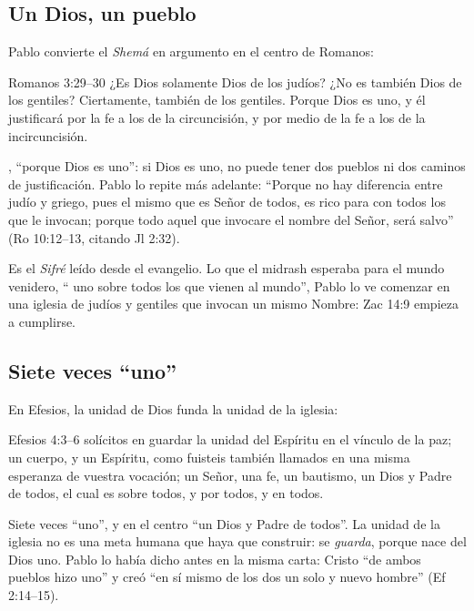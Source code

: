 \subsection{Un Dios, un pueblo}
Pablo convierte el \emph{Shemá} en argumento en el centro de Romanos:

\begin{verso}{Romanos 3:29–30}
¿Es Dios solamente Dios de los judíos? ¿No es también Dios de los gentiles? Ciertamente, también de los gentiles. Porque Dios es uno, y él justificará por la fe a los de la circuncisión, y por medio de la fe a los de la incircuncisión.
\end{verso}

, ``porque Dios es uno'': si Dios es uno, no puede tener dos pueblos ni dos caminos de justificación. Pablo lo repite más adelante: ``Porque no hay diferencia entre judío y griego, pues el mismo que es Señor de todos, es rico para con todos los que le invocan; porque todo aquel que invocare el nombre del Señor, será salvo'' (Ro 10:12--13, citando Jl 2:32).

Es el \emph{Sifré} leído desde el evangelio. Lo que el midrash esperaba para el mundo venidero, ``\SENOR{} uno sobre todos los que vienen al mundo'', Pablo lo ve comenzar en una iglesia de judíos y gentiles que invocan un mismo Nombre: Zac 14:9 empieza a cumplirse.


\subsection{Siete veces “uno”}
En Efesios, la unidad de Dios funda la unidad de la iglesia:

\begin{verso}{Efesios 4:3–6}
solícitos en guardar la unidad del Espíritu en el vínculo de la paz; un cuerpo, y un Espíritu, como fuisteis también llamados en una misma esperanza de vuestra vocación; un Señor, una fe, un bautismo, un Dios y Padre de todos, el cual es sobre todos, y por todos, y en todos.
\end{verso}

Siete veces ``uno'', y en el centro ``un Dios y Padre de todos''. La unidad de la iglesia no es una meta humana que haya que construir: se \emph{guarda}, porque nace del Dios uno. Pablo lo había dicho antes en la misma carta: Cristo ``de ambos pueblos hizo uno'' y creó ``en sí mismo de los dos un solo y nuevo hombre'' (Ef 2:14--15).

